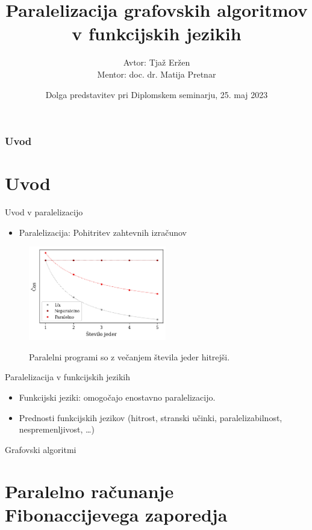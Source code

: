 \documentclass{beamer}
\title[Paralelizacija grafovskih algoritmov v funkcijskih jezikih]
{Paralelizacija grafovskih algoritmov v funkcijskih jezikih}
\author[Avtor: Tjaž Eržen, Mentor: doc. dr. Matija Pretnar]
{Avtor: Tjaž Eržen\\Mentor: doc. dr. Matija Pretnar}
\date[25. maj 2023]
{Dolga predstavitev pri Diplomskem seminarju, 25. maj 2023}
\begin{document}
\begin{frame}
  \titlepage
\end{frame}

\begin{frame}
  \frametitle{Uvod}
  \tableofcontents
\end{frame}

\section{Uvod}

\begin{frame}{Uvod v paralelizacijo}
    \begin{itemize}
        \item Paralelizacija: Pohitritev zahtevnih izračunov
    \end{itemize}
    \begin{figure}
        \caption{Paralelni programi so z večanjem števila jeder hitrejši.}
        \includegraphics[width=6cm]{slike/cilj-casovne-zahtevnosti-paralelizacije.png}
        \label{fig:cilj-casovne-zahtevnosti-paralelizacije}
    \end{figure}
\end{frame}


\begin{frame}{Paralelizacija v funkcijskih jezikih}
    \begin{itemize}
        \item Funkcijski jeziki: omogočajo enostavno paralelizacijo.
        \item Prednosti funkcijskih jezikov (hitrost, stranski učinki, paralelizabilnost, nespremenljivost, \dots)
    \end{itemize}
\end{frame}

\begin{frame}{Grafovski algoritmi}

\end{frame}


\section{Paralelno računanje Fibonaccijevega zaporedja}
\end{document}
